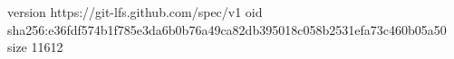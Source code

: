 version https://git-lfs.github.com/spec/v1
oid sha256:e36fdf574b1f785e3da6b0b76a49ca82db395018c058b2531efa73c460b05a50
size 11612
